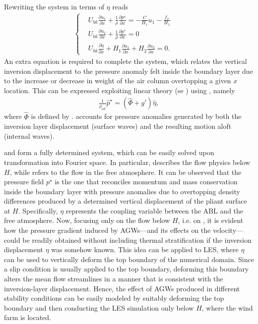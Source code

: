 Rewriting the system in terms of $\eta$ reads
\begin{align}
	\left\{
	\begin{alignedat}{3}
		&  U_{bk}\frac{\partial u_1}{\partial x}
		+ \frac{1}{\rho}\frac{\partial p^\star}{\partial x}
		=
		- \frac{C}{H_1}u_1 
		- \frac{f_x}{H_1}  \\	
		&  U_{bk}\frac{\partial u_2}{\partial x}
		+ \frac{1}{\rho}\frac{\partial p^\star}{\partial x}
		=
		0 \\	
		&  U_{bk} \frac{\partial \eta}{\partial x} 
		+ H_1\frac{\partial u_1}{\partial x} + H_2\frac{\partial u_2}{\partial x} = 0. 
	\end{alignedat}
	\right. &&\label{eq:3LM_Layer_Simplified}
\end{align}	
An extra equation is required to complete the system, which relates the vertical inversion displacement to the pressure anomaly felt inside the boundary layer due to the increase or decrease in weight of the air column overtopping a given $x$ location. This can be expressed exploiting linear theory (se ) using , namely
\begin{align}
	\frac{1}{\rho_\text{ref}}\hat{p}^\star = (\hat{\Phi}+g') \hat{\eta}, \label{eq:linearTheory}
\end{align}
where $\hat{\Phi}$ is defined by .  accounts for pressure anomalies generated by both the inversion layer displacement (surface waves) and the resulting motion aloft (internal waves). 

 and  form a fully determined system, which can be easily solved upon transformation into Fourier space. In particular,  describes the flow physics below $H$, while  refers to the flow in the free atmosphere. It can be observed that the pressure field $p^\star$ is the one that reconciles momentum and mass conservation inside the boundary layer with pressure anomalies due to overtopping density differences produced by a determined vertical displacement of the pliant surface at $H$. Specifically, $\eta$ represents the coupling variable between the ABL and the free atmosphere. Now, focusing only on the flow below $H$, i.e. on , it is evident how the pressure gradient induced by AGWs---and its effects on the velocity---could be readily obtained without including thermal stratification if the inversion displacement $\eta$ was somehow known. This idea can be applied to LES, where $\eta$ can be used to vertically deform the top boundary of the numerical domain. Since a slip condition is usually applied to the top boundary, deforming this boundary alters the mean flow streamlines in a manner that is consistent with the inversion-layer displacement. Hence, the effect of AGWs produced in different stability conditions can be easily modeled by suitably deforming the top boundary and then conducting the LES simulation only below $H$, where the wind farm is located.

